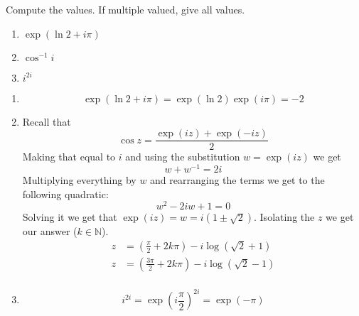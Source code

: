 \documentclass{article}
\def\N{\mathbb{N}}
\renewcommand{\exp}[1]{\operatorname{exp}\left(#1\right)}
\begin{document}
    \begin{tcolorbox}[title=Exercise 4]
        Compute the values. If multiple valued, give all values.
        \begin{enumerate}[label=(\alph*)]
            \item $\exp{\ln{2} + i\pi}$
            \item $\cos^{-1}{i}$
            \item $i^{2i}$
        \end{enumerate}
    \end{tcolorbox}
    \begin{enumerate}[label=(\alph*)]
        \item \begin{equation*}
            \exp{\ln{2} + i\pi} = \exp{\ln{2}}\exp{i\pi} = -2
        \end{equation*}
        \item Recall that
        \begin{equation*}
            \cos{z} = \frac{\exp{iz} + \exp{-iz}}{2}
        \end{equation*}
        Making that equal to $i$ and using the substitution $w = \exp{iz}$ we get
        \begin{equation*}
            w + w^{-1} = 2i
        \end{equation*}
        Multiplying everything by $w$ and rearranging the terms we get to the following quadratic:
        \begin{equation*}
            w^2 - 2iw + 1 = 0
        \end{equation*}
        Solving it we get that $\exp{iz} = w = i(1 \pm \sqrt{2})$. Isolating the $z$ we get our answer ($k \in \N$).
        \begin{align*}
            z &= \left(\frac{\pi}{2} + 2k\pi\right) -i\log(\sqrt{2} + 1) \\
            z &= \left(\frac{3\pi}{2} + 2k\pi\right) -i\log(\sqrt{2} - 1) \\
        \end{align*}
        \item \begin{equation*}
            i^{2i} = \exp{i \frac{\pi}{2}}^{2i} = \exp{-\pi}
        \end{equation*}
    \end{enumerate}
\end{document}
